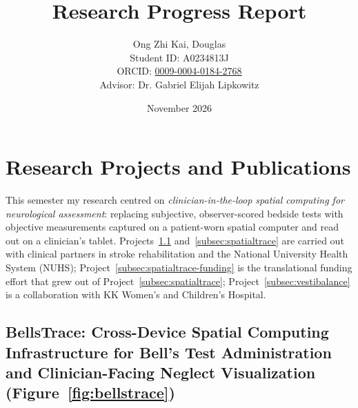 \documentclass[12pt]{article}
\title{\textbf{Research Progress Report}}
\author{
  Ong Zhi Kai, Douglas \\[0.4em]
  \small Student ID: A0234813J \\
  \small ORCID: \href{https://orcid.org/0009-0004-0184-2768}{0009-0004-0184-2768} \\
  \small Advisor: Dr. Gabriel Elijah Lipkowitz
}
\date{November 2026}
\begin{document}
\maketitle

\tableofcontents
\newpage

\section{Research Projects and Publications}

This semester my research centred on \textit{clinician-in-the-loop spatial computing for neurological assessment}: replacing subjective, observer-scored bedside tests with objective measurements captured on a patient-worn spatial computer and read out on a clinician's tablet.
Projects~\ref{subsec:bellstrace} and~\ref{subsec:spatialtrace} are carried out with clinical partners in stroke rehabilitation and the National University Health System (NUHS); Project~\ref{subsec:spatialtrace-funding} is the translational funding effort that grew out of Project~\ref{subsec:spatialtrace}; Project~\ref{subsec:vestibalance} is a collaboration with KK Women's and Children's Hospital.

\subsection{BellsTrace: Cross-Device Spatial Computing Infrastructure for Bell's Test Administration and Clinician-Facing Neglect Visualization (Figure~\ref{fig:bellstrace})}
\label{subsec:bellstrace}
\end{document}
